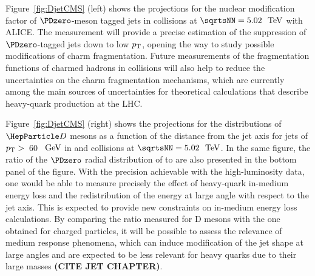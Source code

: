 Figure~\ref{fig:DjetCMS} (left) shows the projections for the nuclear modification factor of $\PDzero$-meson tagged jets in \PbPb collisions at $\sqrtsNN=5.02~{\UTeV}$ with ALICE. The measurement will provide a precise estimation of the suppression of $\PDzero$-tagged jets down to low $p\sb{\scriptstyle\mathrm{T}}$, opening the way to study possible modifications of charm fragmentation. Future measurements of the fragmentation functions of charmed hadrons in \pp collisions will also help to reduce the uncertainties on the charm fragmentation mechanisms, which are currently among the main sources of uncertainties for theoretical calculations that describe heavy-quark production at the LHC. 

Figure~\ref{fig:DjetCMS} (right) shows the projections for the distributions of $\PD$ mesons as a function of the distance from the jet axis for jets of $p\sb{\scriptstyle\mathrm{T}}>$~60~$~\text{GeV}$ in \pp and \PbPb collisions at $\sqrtsNN=5.02~{\UTeV}$. In the same figure, the ratio of the $\PDzero$ radial distribution of \PbPb to \pp are also presented in the bottom panel of the figure. With the precision achievable with the high-luminosity data, one would be able to measure precisely the effect of heavy-quark in-medium energy loss and the redistribution of the energy at large angle with respect to the jet axis. This is expected to provide new constraints on in-medium energy loss calculations. By comparing the ratio measured for D mesons with the one obtained for charged particles, it will be possible to assess the relevance of medium response phenomena, which can induce modification of the jet shape at large angles and are expected to be less relevant for heavy quarks due to their large masses \textbf{(CITE JET CHAPTER)}.

